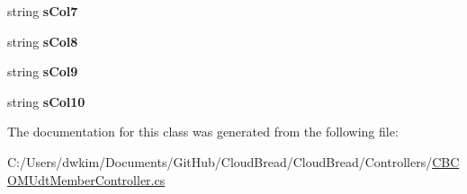 \begin{DoxyCompactItemize}
\item 
string {\bfseries s\+Col7}\hypertarget{a00097_a6a06bc22c74e459c0c12eff1aebf9361}{}\label{a00097_a6a06bc22c74e459c0c12eff1aebf9361}

\item 
string {\bfseries s\+Col8}\hypertarget{a00097_af6fd531d6b7352b7d41dd9534ff53ec1}{}\label{a00097_af6fd531d6b7352b7d41dd9534ff53ec1}

\item 
string {\bfseries s\+Col9}\hypertarget{a00097_ae9a94dadcd0412cde0f331e151fd76e2}{}\label{a00097_ae9a94dadcd0412cde0f331e151fd76e2}

\item 
string {\bfseries s\+Col10}\hypertarget{a00097_a929616ab2325d593f98b3f3c9cf807e3}{}\label{a00097_a929616ab2325d593f98b3f3c9cf807e3}

\end{DoxyCompactItemize}


The documentation for this class was generated from the following file\+:\begin{DoxyCompactItemize}
\item 
C\+:/\+Users/dwkim/\+Documents/\+Git\+Hub/\+Cloud\+Bread/\+Cloud\+Bread/\+Controllers/\hyperlink{a00209}{C\+B\+C\+O\+M\+Udt\+Member\+Controller.\+cs}\end{DoxyCompactItemize}
